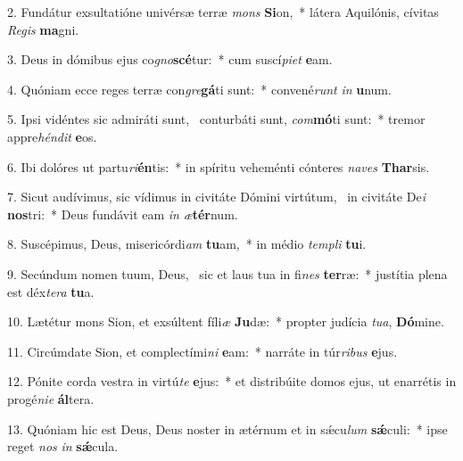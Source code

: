 2. Fundátur exsultatióne univérsæ terræ \textit{mons} \textbf{Si}on,~*  látera Aquilónis, cívitas \textit{Re}\textit{gis} \textbf{ma}gni.\

3. Deus in dómibus ejus co\textit{gno}\textbf{scé}tur:~*  cum suscí\textit{pi}\textit{et} \textbf{e}am.\

4. Quóniam ecce reges terræ con\textit{gre}\textbf{gá}ti sunt:~*  convené\textit{runt} \textit{in} \textbf{u}num.\

5. Ipsi vidéntes sic admiráti sunt, \dag\  conturbáti sunt, \textit{com}\textbf{mó}ti sunt:~*  tremor appre\textit{hén}\textit{dit} \textbf{e}os.\

6. Ibi dolóres ut partu\textit{ri}\textbf{én}tis:~*  in spíritu veheménti cónteres \textit{na}\textit{ves} \textbf{Thar}sis.\

7. Sicut audívimus, sic vídimus in civitáte Dómini virtútum, \dag\  in civitáte De\textit{i} \textbf{nos}tri:~*  Deus fundávit eam \textit{in} \textit{æ}\textbf{tér}num.\

8. Suscépimus, Deus, misericórdi\textit{am} \textbf{tu}am,~*  in médio \textit{tem}\textit{pli} \textbf{tu}i.\

9. Secúndum nomen tuum, Deus, \dag\  sic et laus tua in fi\textit{nes} \textbf{ter}ræ:~*  justítia plena est déx\textit{te}\textit{ra} \textbf{tu}a.\

10. Lætétur mons Sion, et exsúltent fíli\textit{æ} \textbf{Ju}dæ:~*  propter judícia \textit{tu}\textit{a}, \textbf{Dó}mine.\

11. Circúmdate Sion, et complectími\textit{ni} \textbf{e}am:~*  narráte in túr\textit{ri}\textit{bus} \textbf{e}jus.\

12. Pónite corda vestra in virtú\textit{te} \textbf{e}jus:~*  et distribúite domos ejus, ut enarrétis in progé\textit{ni}\textit{e} \textbf{ál}tera.\

13. Quóniam hic est Deus, Deus noster in ætérnum et in sǽcu\textit{lum} \textbf{sǽ}culi:~*  ipse reget \textit{nos} \textit{in} \textbf{sǽ}cula.\

